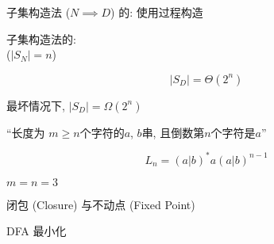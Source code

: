\begin{frame}{}
  \begin{center}
    子集构造法 ($N \implies D$) 的: 
    使用过程构造

  \end{center}
\end{frame}

\begin{frame}{}
  \begin{center}
    子集构造法的: \\
    ($|S_{N}| = n$)

    \[
      |S_{D}| = \Theta(2^n)
    \]

    \vspace{0.30cm}
    最坏情况下, $|S_{D}| = \Omega(2^n)$
  \end{center}
\end{frame}

\begin{frame}{}
  \begin{center}
    ``长度为 $m \ge n$个字符的$a$, $b$串, 且倒数第$n$个字符是$a$''

    \pause
    \[
      L_{n} = (a | b)^{\ast} a (a | b)^{n-1}
    \]

    \pause

    \pause
    \vspace{0.30cm}
     $m = n = 3$
  \end{center}
\end{frame}

\begin{frame}{}
  \begin{center}
    闭包 (Closure) 与不动点 (Fixed Point)
  \end{center}
\end{frame}

\begin{frame}{}

  \vspace{0.30cm}
  \begin{center}
    DFA 最小化
  \end{center}
\end{frame}

